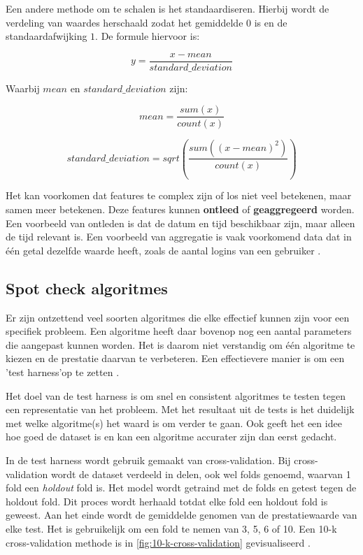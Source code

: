 Een andere methode om te schalen is het standaardiseren. Hierbij wordt de verdeling van waardes herschaald zodat het gemiddelde \(0\) is en de standaardafwijking \(1\). De formule hiervoor is:

\[y = \frac{x - mean}{standard\_deviation}\]

Waarbij \(mean\) en \(standard\_deviation\) zijn:

\noindent\begin{minipage}{.4\linewidth}
    \[mean = \frac{sum(x)}{count(x)}\]
  \end{minipage}%
  \begin{minipage}{.6\linewidth}
    \[standard\_deviation = sqrt\left(\frac{sum((x - mean)^2)}{count(x)}\right)\]
\end{minipage}

Het kan voorkomen dat features te complex zijn of los niet veel betekenen, maar samen meer betekenen. Deze features kunnen \textbf{ontleed} of \textbf{geaggregeerd} worden. Een voorbeeld van ontleden is dat de datum en tijd beschikbaar zijn, maar alleen de tijd relevant is. Een voorbeeld van aggregatie is vaak voorkomend data dat in één getal dezelfde waarde heeft, zoals de aantal logins van een gebruiker \cite{ml-prepare-data-brownlee}.

\subsection{Spot check algoritmes}\label{subsec:spot-check-algoritmes}
Er zijn ontzettend veel soorten algoritmes die elke effectief kunnen zijn voor een specifiek probleem. Een algoritme heeft daar bovenop nog een aantal parameters die aangepast kunnen worden. Het is daarom niet verstandig om één algoritme te kiezen en de prestatie daarvan te verbeteren. Een effectievere manier is om een 'test harness'\space op te zetten \cite{ml-evaluate-ml-algorithm-brownlee}.

Het doel van de test harness is om snel en consistent algoritmes te testen tegen een representatie van het probleem. Met het resultaat uit de tests is het duidelijk met welke algoritme(s) het waard is om verder te gaan. Ook geeft het een idee hoe goed de dataset is en kan een algoritme accurater zijn dan eerst gedacht.

In de test harness wordt gebruik gemaakt van \gls{cross-validation}. Bij cross-validation wordt de dataset verdeeld in delen, ook wel \glspl{fold} genoemd, waarvan 1 fold een \textit{holdout} fold is. Het model wordt getraind met de folds en getest tegen de holdout fold. Dit proces wordt herhaald totdat elke fold een holdout fold is geweest. Aan het einde wordt de gemiddelde genomen van de prestatiewaarde van elke test. Het is gebruikelijk om een fold te nemen van 3, 5, 6 of 10. Een 10-k cross-validation methode is in \autoref{fig:10-k-cross-validation} gevisualiseerd \cite{ml-evaluate-ml-algorithm-brownlee}.

